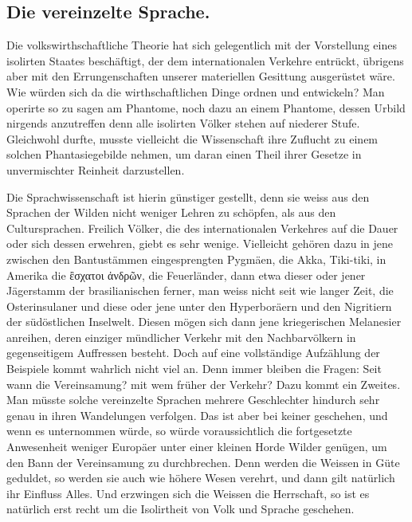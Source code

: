 {\subsection*{Die vereinzelte Sprache.}
Die volkswirthschaftliche Theorie hat sich gelegentlich mit der Vorstellung eines isolirten Staates beschäftigt, der dem internationalen Verkehre entrückt, übrigens aber mit den Errungenschaften unserer materiellen Gesittung ausgerüstet wäre. Wie würden sich da die wirthschaftlichen Dinge ordnen und entwickeln? \label{sp.177} Man operirte so zu sagen am Phantome, noch dazu an einem Phantome, dessen Urbild nirgends anzutreffen  denn alle isolirten Völker stehen auf niederer  Stufe. Gleichwohl durfte, musste vielleicht die Wissenschaft ihre Zuflucht zu einem solchen Phantasiegebilde nehmen, um daran einen Theil ihrer Gesetze in unvermischter Reinheit darzustellen.

\label{fp.186}

Die Sprachwissenschaft ist hierin günstiger gestellt, denn sie weiss aus den Sprachen der Wilden nicht weniger Lehren zu schöpfen, als aus den Cultursprachen. Freilich Völker, die des internationalen Verkehres auf die Dauer  oder sich dessen erwehren, giebt es sehr wenige. Vielleicht gehören dazu in  jene zwischen den Bantustämmen eingesprengten Pygmäen, die Akka, Tiki-tiki, in Amerika die ἒσχατοι ἀνδρῶν, die Feuerländer, dann etwa dieser oder jener Jägerstamm der brasilianischen  ferner, man weiss nicht seit wie langer Zeit, die Osterinsulaner und diese oder jene unter den Hyperboräern und den Nigritiern der südöstlichen Inselwelt. Diesen mögen sich dann jene kriegerischen Melanesier anreihen, deren einziger mündlicher Verkehr mit den Nachbarvölkern in gegenseitigem Auffressen besteht. Doch auf eine vollständige Aufzählung der Beispiele kommt wahrlich nicht viel an. Denn immer bleiben die Fragen: Seit wann die Vereinsamung? mit wem früher der Verkehr? Dazu kommt ein Zweites. Man müsste solche vereinzelte Sprachen mehrere Geschlechter hindurch sehr genau in ihren Wandelungen verfolgen. Das ist aber bei keiner geschehen, und wenn es unternommen würde, so würde voraussichtlich die fortgesetzte Anwesenheit weniger Europäer unter einer kleinen Horde Wilder genügen, um den Bann der Vereinsamung zu durchbrechen. Denn werden die Weissen in Güte geduldet, so werden sie auch wie höhere Wesen verehrt, und dann gilt natürlich ihr Einfluss Alles. Und erzwingen sich die Weissen die Herrschaft, so ist es natürlich erst recht um die Isolirtheit von Volk und Sprache geschehen.

}

